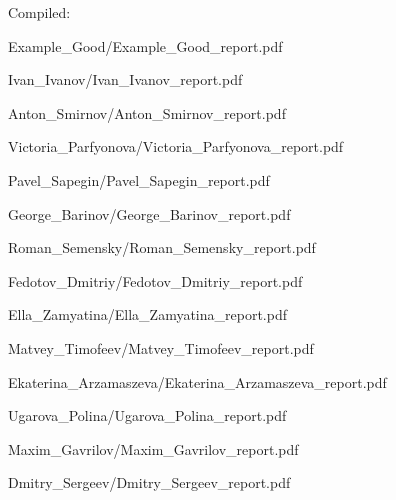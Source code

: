 \documentclass[a4paper]{article}
\begin{document}
Compiled: \DTMnow
\tableofcontents

\clearpage

{Example_Good/Example_Good_report.pdf}

{Ivan_Ivanov/Ivan_Ivanov_report.pdf}

{Anton_Smirnov/Anton_Smirnov_report.pdf}

{Victoria_Parfyonova/Victoria_Parfyonova_report.pdf}

{Pavel_Sapegin/Pavel_Sapegin_report.pdf}

{George_Barinov/George_Barinov_report.pdf}

{Roman_Semensky/Roman_Semensky_report.pdf}

{Fedotov_Dmitriy/Fedotov_Dmitriy_report.pdf}

{Ella_Zamyatina/Ella_Zamyatina_report.pdf}

{Matvey_Timofeev/Matvey_Timofeev_report.pdf}

{Ekaterina_Arzamaszeva/Ekaterina_Arzamaszeva_report.pdf}

{Ugarova_Polina/Ugarova_Polina_report.pdf}

{Maxim_Gavrilov/Maxim_Gavrilov_report.pdf}

{Dmitry_Sergeev/Dmitry_Sergeev_report.pdf}
\end{document}
